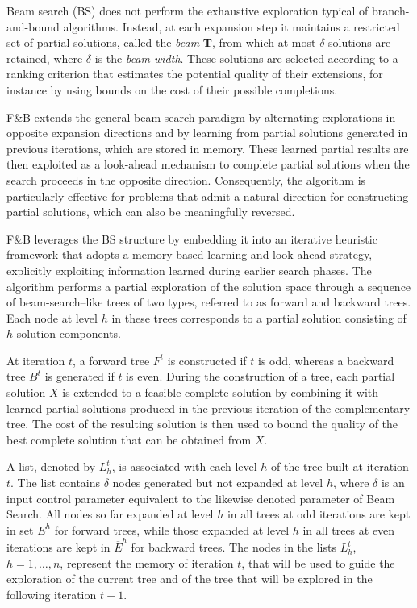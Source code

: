 \documentclass[runningheads]{llncs}
\begin{document}
Beam search (BS) does not perform the exhaustive exploration typical of branch-and-bound algorithms. Instead, at each expansion step it maintains a restricted set of partial solutions, called the {\it beam} {\bf T}, from which at most $\delta$ solutions are retained, where $\delta$ is the {\it beam width}. These solutions are selected according to a ranking criterion that estimates the potential quality of their extensions, for instance by using bounds on the cost of their possible completions. 

F\&B extends the general beam search paradigm by alternating explorations in opposite expansion directions and by learning from partial solutions generated in previous iterations, which are stored in memory. These learned partial results are then exploited as a look-ahead mechanism to complete partial solutions when the search proceeds in the opposite direction. Consequently, the algorithm is particularly effective for problems that admit a natural direction for constructing partial solutions, which can also be meaningfully reversed.

F\&B leverages the BS structure by embedding it into an iterative heuristic framework that adopts a memory-based learning and look-ahead strategy, explicitly exploiting information learned during earlier search phases. The algorithm performs a partial exploration of the solution space through a sequence of beam-search–like trees of two types, referred to as forward and backward trees. Each node at level $h$ in these trees corresponds to a partial solution consisting of $h$ solution components.

At iteration $t$, a forward tree $F^t$ is constructed if $t$ is odd, whereas a backward tree $B^t$ is generated if $t$ is even. During the construction of a tree, each partial solution $X$ is extended to a feasible complete solution by combining it with learned partial solutions produced in the previous iteration of the complementary tree. The cost of the resulting solution is then used to bound the quality of the best complete solution that can be obtained from $X$.

A list, denoted by $L^t_h$, is associated with each level $h$ of the tree built at iteration $t$. The list contains $\delta$ nodes generated but not expanded at level $h$, where $\delta$ is an input control parameter equivalent to the likewise denoted parameter of Beam Search. All nodes so far expanded at level $h$ in all trees at odd iterations are kept in set $E^h$ for forward trees, while those expanded at level $h$ in all trees at even iterations are kept in $\overline{E}^h$ for backward trees.
The nodes in the lists $L^t_h$, $h=1,\ldots, n$, represent the memory of iteration $t$, that will be used to guide the exploration of the current tree and of the tree that will be explored in the following iteration $t+1$. 
\end{document}
